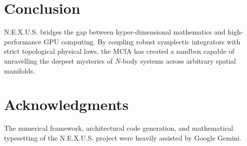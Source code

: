 \documentclass[11pt,a4paper]{article}
\begin{document}
\section{Conclusion}
N.E.X.U.S. bridges the gap between hyper-dimensional mathematics and high-performance GPU computing. By coupling robust symplectic integrators with strict topological physical laws, the MCfA has created a sandbox capable of unravelling the deepest mysteries of $N$-body systems across arbitrary spatial manifolds.

\section*{Acknowledgments}
The numerical framework, architectural code generation, and mathematical typesetting of the N.E.X.U.S. project were heavily assisted by Google Gemini.
\end{document}
